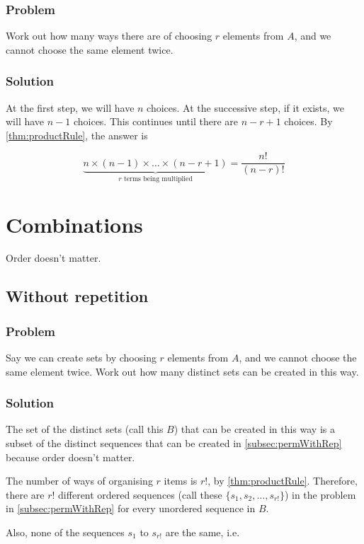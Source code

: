 \documentclass[a4paper,12pt]{article}
\begin{document}
\subsubsection{Problem}
Work out how many ways there are of choosing $r$ elements from $A$, and we cannot choose the same element twice.

\subsubsection{Solution}
At the first step, we will have $n$ choices. At the successive step, if it exists, we will have $n-1$ choices. This continues until there are $n-r+1$ choices. By \cref{thm:productRule}, the answer is

\begin{equation}
  \underbrace{n \times (n-1) \times \ldots \times (n-r+1)}_{\text{$r$ terms being multiplied}} = \frac{n!}{(n-r)!}
\end{equation}

\section{Combinations}
Order doesn't matter.
\subsection{Without repetition}
\label{subsec:combWithoutRep}
\subsubsection{Problem}
Say we can create sets by choosing $r$ elements from $A$, and we cannot choose the same element twice. Work out how many distinct sets can be created in this way.

\subsubsection{Solution}
The set of the distinct sets (call this $B$) that can be created in this way is a subset of the distinct sequences that can be created in \cref{subsec:permWithRep} because order doesn't matter.

The number of ways of organising $r$ items is $r!$, by \cref{thm:productRule}. Therefore, there are $r!$ different ordered sequences (call these $\{s_1, s_2, \ldots, s_{r!}\}$) in the problem in \cref{subsec:permWithRep} for every unordered sequence in $B$.

Also, none of the sequences $s_1$ to $s_{r!}$ are the same, i.e.\
\end{document}
